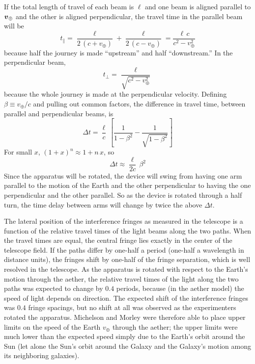 If the total length of travel of each beam is $\ell$ and one beam is
aligned parallel to $\mbox{\boldmath $v$}_{\oplus}$ and the other is aligned
perpendicular, the travel time in the parallel beam will be
\begin{equation}
t_{\|}=\frac{\ell}{2\,(c+v_{\oplus})}+\frac{\ell}{2\,(c-v_{\oplus})}
 =\frac{\ell\,c}{c^2-v_{\oplus}^2}
\end{equation}
because half the journey is made ``upstream'' and half ``downstream.''
In the perpendicular beam,
\begin{equation}
t_{\bot}=\frac{\ell}{\sqrt{c^2-v_{\oplus}^2}}
\end{equation}
because the whole journey is made at the perpendicular velocity.
Defining $\beta\equiv v_{\oplus}/c$ and pulling out common factors,
the difference in travel time, between parallel and perpendicular
beams, is
\begin{equation}
\Delta t=\frac{\ell}{c}\,
 \left[\frac{1}{1-\beta^2}-\frac{1}{\sqrt{1-\beta^2}}\right]
\end{equation}
For small $x$, $(1+x)^n\approx 1+n\,x$, so
\begin{equation}
\Delta t\approx\frac{\ell}{2c}\,\beta^2
\end{equation}
Since the apparatus will be rotated, the device will swing from having
one arm parallel to the motion of the Earth and the other
perpendicular to having the one perpendicular and the other parallel.
So as the device is rotated through a half turn, the time delay
between arms will change by twice the above $\Delta t$.

The lateral position of the interference fringes as measured in the
telescope is a function of the relative travel times of the light
beams along the two paths.  When the travel times are equal, the
central fringe lies exactly in the center of the telescope field.  If
the paths differ by one-half a period (one-half a wavelength in
distance units), the fringes shift by one-half of the fringe
separation, which is well resolved in the telescope.  As the apparatus
is rotated with respect to the Earth's motion through the aether, the
relative travel times of the light along the two paths was expected to
change by $0.4$ periods, because (in the aether model) the speed of
light depends on direction.  The expected shift of the interference
fringes was $0.4$ fringe spacings, but no shift at all was observed as
the experimenters rotated the apparatus.  Michelson and Morley were
therefore able to place upper limits on the speed of the Earth
$v_{\oplus}$ through the aether; the upper limits were much lower than
the expected speed simply due to the Earth's orbit around the Sun (let
alone the Sun's orbit around the Galaxy and the Galaxy's motion among
its neighboring galaxies).

